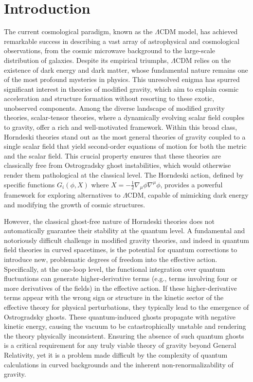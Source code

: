 \documentclass[twocolumn]{aastex631}
\begin{document}


\section{Introduction}
\label{sec:intro}

The current cosmological paradigm, known as the $\Lambda$CDM model, has achieved remarkable success in describing a vast array of astrophysical and cosmological observations, from the cosmic microwave background to the large-scale distribution of galaxies. Despite its empirical triumphs, $\Lambda$CDM relies on the existence of dark energy and dark matter, whose fundamental nature remains one of the most profound mysteries in physics. This unresolved enigma has spurred significant interest in theories of modified gravity, which aim to explain cosmic acceleration and structure formation without resorting to these exotic, unobserved components. Among the diverse landscape of modified gravity theories, scalar-tensor theories, where a dynamically evolving scalar field couples to gravity, offer a rich and well-motivated framework. Within this broad class, Horndeski theories stand out as the most general theories of gravity coupled to a single scalar field that yield second-order equations of motion for both the metric and the scalar field. This crucial property ensures that these theories are classically free from Ostrogradsky ghost instabilities, which would otherwise render them pathological at the classical level. The Horndeski action, defined by specific functions $G_i(\phi, X)$ where $X = -\frac{1}{2}\nabla_\mu\phi \nabla^\mu\phi$, provides a powerful framework for exploring alternatives to $\Lambda$CDM, capable of mimicking dark energy and modifying the growth of cosmic structures.

However, the classical ghost-free nature of Horndeski theories does not automatically guarantee their stability at the quantum level. A fundamental and notoriously difficult challenge in modified gravity theories, and indeed in quantum field theories in curved spacetimes, is the potential for quantum corrections to introduce new, problematic degrees of freedom into the effective action. Specifically, at the one-loop level, the functional integration over quantum fluctuations can generate higher-derivative terms (e.g., terms involving four or more derivatives of the fields) in the effective action. If these higher-derivative terms appear with the wrong sign or structure in the kinetic sector of the effective theory for physical perturbations, they typically lead to the emergence of Ostrogradsky ghosts. These quantum-induced ghosts propagate with negative kinetic energy, causing the vacuum to be catastrophically unstable and rendering the theory physically inconsistent. Ensuring the absence of such quantum ghosts is a critical requirement for any truly viable theory of gravity beyond General Relativity, yet it is a problem made difficult by the complexity of quantum calculations in curved backgrounds and the inherent non-renormalizability of gravity.
\end{document}
